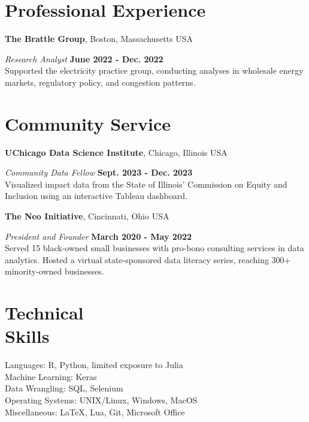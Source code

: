 \documentclass[margin,line]{res}
\newenvironment{list2}{
  \begin{list}{$\bullet$}{%
      \setlength{\itemsep}{0in}
      \setlength{\parsep}{0in} \setlength{\parskip}{0in}
      \setlength{\topsep}{0in} \setlength{\partopsep}{0in} 
      \setlength{\leftmargin}{0.2in}}}{\end{list}}
\begin{document}
\begin{resume}

\section{\sc Professional Experience}
{\bf The Brattle Group}, Boston, Massachusetts USA

\vspace{-.3cm}
{\em Research Analyst} \hfill {\bf June 2022 - Dec. 2022}\\
Supported the electricity practice group, conducting analyses in wholesale energy markets, regulatory policy, and congestion patterns. 


\section{\sc Community Service}
{\bf UChicago Data Science Institute}, Chicago, Illinois USA

\vspace{-.3cm}
{\em Community Data Fellow} \hfill {\bf Sept. 2023 - Dec. 2023}\\
Visualized impact data from the State of Illinois' Commission on Equity and Inclusion using an interactive Tableau dashboard. 

{\bf The Neo Initiative}, Cincinnati, Ohio USA

\vspace{-.3cm}
{\em President and Founder} \hfill {\bf March 2020 -  May 2022}\\
Served 15 black-owned small businesses with pro-bono consulting services in data analytics. Hosted a virtual state-sponsored data literacy series, reaching 300+ minority-owned businesses. 

\section{\sc Technical \\ Skills} 
Languages: R, Python, limited exposure to Julia \\
Machine Learning: Keras \\ 
Data Wrangling: SQL, Selenium \\
Operating Systems:  UNIX/Linux, Windows, MacOS \\
Miscellaneous: \LaTeX, Lua, Git, Microsoft Office


\end{resume}
\end{document}
